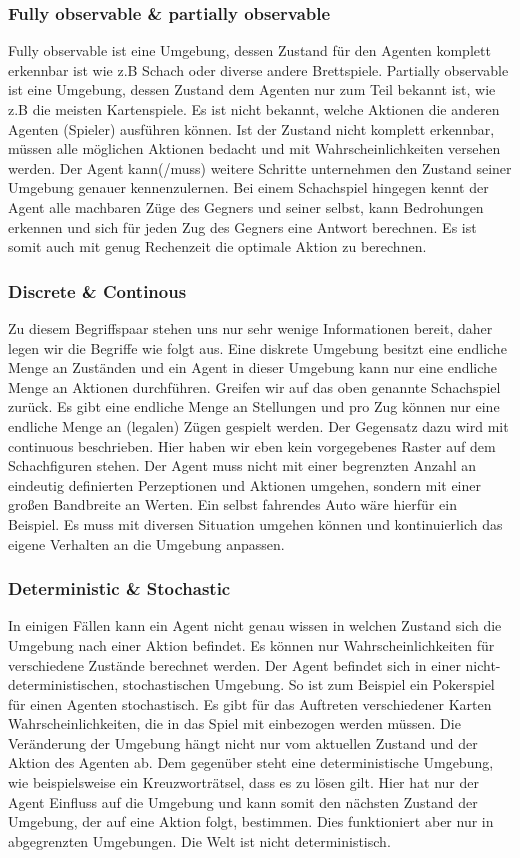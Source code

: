 \documentclass[10pt,a4wide]{scrartcl}
\begin{document}
		\subsubsection{Fully observable \& partially observable}
		Fully observable ist eine Umgebung, dessen Zustand für den Agenten komplett erkennbar ist wie z.B Schach oder diverse andere Brettspiele. Partially observable ist eine Umgebung, dessen Zustand dem Agenten nur zum Teil bekannt ist, wie z.B die meisten Kartenspiele. Es ist nicht bekannt, welche Aktionen die anderen Agenten (Spieler) ausführen können. Ist der Zustand nicht komplett erkennbar, müssen alle möglichen Aktionen bedacht und mit Wahrscheinlichkeiten versehen werden. Der Agent kann(/muss) weitere Schritte unternehmen den Zustand seiner Umgebung genauer kennenzulernen. Bei einem Schachspiel hingegen kennt der Agent alle machbaren Züge des Gegners und seiner selbst, kann Bedrohungen erkennen und sich für jeden Zug des Gegners eine Antwort berechnen. Es ist somit auch mit genug Rechenzeit die optimale Aktion zu berechnen.
		
		\subsubsection{Discrete \& Continous}
		Zu diesem Begriffspaar stehen uns nur sehr wenige Informationen bereit, daher legen wir die Begriffe wie folgt aus. Eine diskrete Umgebung besitzt eine endliche Menge an Zuständen und ein Agent in dieser Umgebung kann nur eine endliche Menge an Aktionen durchführen. Greifen wir auf das oben genannte Schachspiel zurück. Es gibt eine endliche Menge an Stellungen und pro Zug können nur eine endliche Menge an (legalen) Zügen gespielt werden. Der Gegensatz dazu wird mit continuous beschrieben. Hier haben wir eben kein vorgegebenes Raster auf dem Schachfiguren stehen. Der Agent muss nicht mit einer begrenzten Anzahl an eindeutig definierten Perzeptionen und Aktionen umgehen, sondern mit einer großen Bandbreite an Werten. Ein selbst fahrendes Auto wäre hierfür ein Beispiel. Es muss mit diversen Situation umgehen können und kontinuierlich das eigene Verhalten an die Umgebung anpassen.
				
		\subsubsection{Deterministic \& Stochastic}
		In einigen Fällen kann ein Agent nicht genau wissen in welchen Zustand sich die Umgebung nach einer Aktion befindet. Es können nur Wahrscheinlichkeiten für verschiedene Zustände berechnet werden. Der Agent befindet sich in einer nicht-deterministischen, stochastischen Umgebung. So ist zum Beispiel ein Pokerspiel für einen Agenten stochastisch. Es gibt für das Auftreten verschiedener Karten Wahrscheinlichkeiten, die in das Spiel mit einbezogen werden müssen. Die Veränderung der Umgebung hängt nicht nur vom aktuellen Zustand und der Aktion des Agenten ab. Dem gegenüber steht eine deterministische Umgebung, wie beispielsweise ein Kreuzworträtsel, dass es zu lösen gilt. Hier hat nur der Agent Einfluss auf die Umgebung und kann somit den nächsten Zustand der Umgebung, der auf eine Aktion folgt, bestimmen. Dies funktioniert aber nur in abgegrenzten Umgebungen. Die Welt ist nicht deterministisch.
\end{document}
